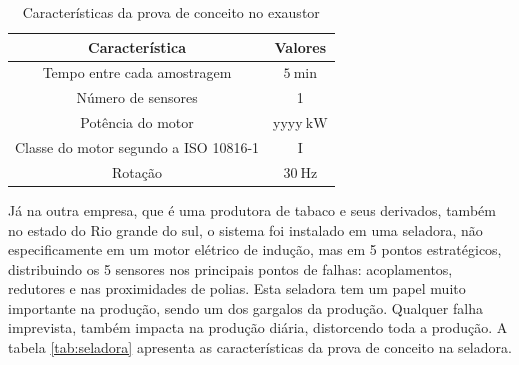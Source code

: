 \begin{table}[H]
    \caption{Características da prova de conceito no exaustor}
    \label{tab:exautor}
    \centering%
    \begin{minipage}{.55\textwidth}
      \begin{tabular*}{\textwidth}{c|c}
        \hline
        Característica                          & Valores                                    \\ \hline
        \hline
        Tempo entre cada amostragem             &  $\SI{5}{\minute}$                         \\
        Número de sensores                      &  1                                         \\ 
        Potência do motor                       &  yyyy$\SI{}{\kilo\watt}$                      \\
        Classe do motor segundo a  ISO 10816-1  &  I                                         \\
        Rotação                                 & $\SI{30}{\hertz}$                          \\ \hline
      \end{tabular*}
    \end{minipage}
  \end{table}


Já na outra empresa, que é uma produtora de tabaco e seus derivados, também no estado do Rio grande do sul, o sistema foi instalado em uma 
seladora, não especificamente em um motor elétrico de indução, mas em 5 pontos estratégicos, distribuindo os 5 sensores nos principais pontos 
de falhas: acoplamentos, redutores e nas proximidades de polias. Esta seladora tem um papel muito importante na produção, sendo um dos gargalos
da produção. Qualquer falha imprevista, também impacta na produção diária, distorcendo toda a produção. A tabela \ref{tab:seladora} apresenta 
as características da prova de conceito na seladora.

